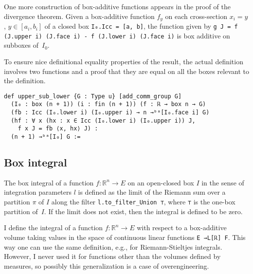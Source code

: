 \documentclass[a4paper,UKenglish,cleveref, autoref, thm-restate]{lipics-v2021}
\newcommand{\bbR}{\mathbb{R}}
\begin{document}
One more construction of box-additive functions appears in the proof
of the divergence theorem. Given a box-additive function \(f_{y}\) on
each cross-section \(x_{i}=y\), \(y \in [a_{i}, b_{i}]\) of a closed
box \lstinline~I₀.Icc = [a, b]~, the function given by
\lstinline~g J = f (J.upper i) (J.face i) - f (J.lower i) (J.face i)~
is box additive on subboxes of~\(I_{0}\).

To ensure nice definitional equality properties of the result, the
actual definition involves two functions and a proof that they are
equal on all the boxes relevant to the definition.

\begin{lstlisting}
def upper_sub_lower {G : Type u} [add_comm_group G]
  (I₀ : box (n + 1)) (i : fin (n + 1)) (f : ℝ → box n → G)
  (fb : Icc (I₀.lower i) (I₀.upper i) → n →ᵇᵃ[I₀.face i] G)
  (hf : ∀ x (hx : x ∈ Icc (I₀.lower i) (I₀.upper i)) J,
    f x J = fb ⟨x, hx⟩ J) :
  (n + 1) →ᵇᵃ[I₀] G :=
\end{lstlisting}

\subsection{Box integral}%
\label{sec:box-integral}

The box integral of a function \(f\colon\bbR^{n}\to E\) on an
open-closed box \(I\) in the sense of integration parameters \(l\) is
defined as the limit of the Riemann sum over a partition \(\pi\) of
\(I\) along the filter \lstinline=l.to_filter_Union ⊤=, where
\lstinline=⊤= is the one-box partition of~\(I\). If the limit does not
exist, then the integral is defined to be zero.

I define the integral of a function \(f\colon \bbR^{n}\to E\) with
respect to a box-additive volume taking values in the space of
continuous linear functions \lstinline=E →L[ℝ] F=. This way one can
use the same definition, e.g., for Riemann-Stieltjes
integrals. However, I never used it for functions other than the
volumes defined by measures, so possibly this generalization is a case
of overengineering.
\end{document}
